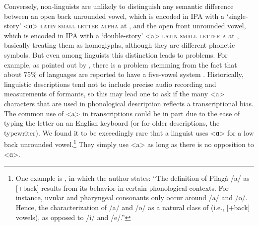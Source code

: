 \begin{itemize}
\end{itemize} 

Conversely, non-linguists are unlikely to distinguish any semantic difference
between an open back unrounded vowel, which is encoded in IPA with a
`single-story' <ɑ> \textsc{latin small letter alpha} at , and the open
front unrounded vowel, which is encoded in IPA with a `double-story' <a>
\textsc{latin small letter a} at , basically treating them as
homoglyphs, although they are different phonetic symbols. But even among
linguists this distinction leads to problems. For example, as pointed out by
\citet{Mielke2009}, there is a problem stemming from the fact that about 75\% of
languages are reported to have a five-vowel system \citep{Maddieson1984}.
Historically, linguistic descriptions tend not to include precise audio
recording and measurements of formants, so this may lead one to ask if the many
<a> characters that are used in phonological description reflects a
transcriptional bias. The common use of <a> in transcriptions could be in part
due to the ease of typing the letter on an English keyboard (or for older
descriptions, the typewriter). We found it to be exceedingly rare that a
linguist uses <ɑ> for a low back unrounded vowel.\footnote{One example is
\citet[75]{Vidal2001}, in which the author states: ``The definition of Pilagá
/a/ as [+back] results from its behavior in certain phonological contexts. For
instance, uvular and pharyngeal consonants only occur around /a/ and /o/. Hence,
the characterization of /a/ and /o/ as a natural class of (i.e., [+back]
vowels), as opposed to /i/ and /e/.''} They simply use <a> as long as there is
no opposition to <ɑ>.


